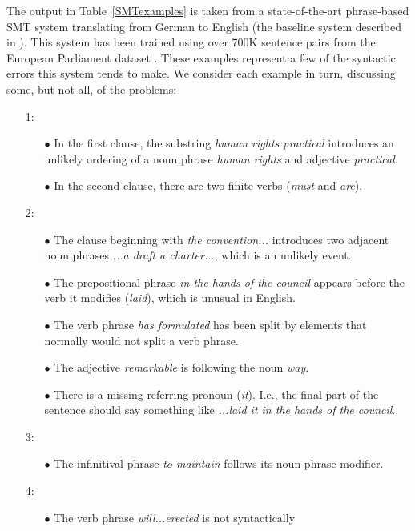 \documentclass[11pt]{report}
\theoremstyle{plain}
\begin{document}
{The output in Table~\ref{SMTexamples} is taken from a state-of-the-art
phrase-based SMT system translating from German to English (the
baseline system described in ). This
system has been trained using over 700K sentence pairs from the
European Parliament dataset . These examples represent a
few of the syntactic errors this system tends to make. We consider
each example in turn, discussing some, but not all, of the problems:

\begin{itemize}
\item[1:] 
\begin{itemize}
\item[$\bullet$] In the first clause, the substring {\em human rights practical}
introduces an unlikely ordering of a noun phrase {\em human rights}
and adjective {\em practical}.
\item[$\bullet$] In the second clause, there are two finite verbs ({\em must} and
{\em are}).
\end{itemize}
\item[2:]
\begin{itemize}
\item[$\bullet$] The clause beginning with {\em the convention...} introduces two
adjacent noun phrases {\em ...a draft a charter...}, which is an
unlikely event.
\item[$\bullet$] The prepositional phrase {\em in the hands of the council}
appears before the verb it modifies ({\em laid}), which is unusual in
English.
\item[$\bullet$] The verb phrase {\em has formulated} has been split by elements
that normally would not split a verb phrase.
\item[$\bullet$] The adjective {\em remarkable} is following the noun {\em way}.
\item[$\bullet$] There is a missing referring pronoun ({\em it}). I.e., the final
part of the sentence should say something like {\em ...laid it in the
hands of the council}.
\end{itemize}
\item[3:]
\begin{itemize}
\item[$\bullet$] The infinitival phrase {\em to maintain} follows its
noun phrase modifier.
\end{itemize}
\item[4:]
\begin{itemize}
\item[$\bullet$] The verb phrase {\em will...erected} is not syntactically

\end{itemize}
\end{itemize}}
\end{document}
